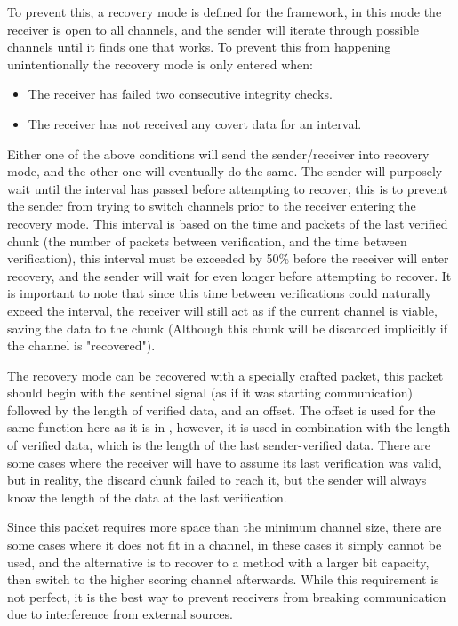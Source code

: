 To prevent this, a recovery mode is defined for the framework, in this mode the receiver is open to all channels, and the sender will iterate through possible channels until it finds one that works. To prevent this from happening unintentionally the recovery mode is only entered when:
\begin{itemize}
    \item The receiver has failed two consecutive integrity checks.
    \item The receiver has not received any covert data for an interval.
\end{itemize}

Either one of the above conditions will send the sender/receiver into recovery mode, and the other one will eventually do the same. The sender will purposely wait until the interval has passed before attempting to recover, this is to prevent the sender from trying to switch channels prior to the receiver entering the recovery mode. This interval is based on the time and packets of the last verified chunk (the number of packets between verification, and the time between verification), this interval must be exceeded by 50\% before the receiver will enter recovery, and the sender will wait for even longer before attempting to recover. It is important to note that since this time between verifications could naturally exceed the interval, the receiver will still act as if the current channel is viable, saving the data to the chunk (Although this chunk will be discarded implicitly if the channel is "recovered").

The recovery mode can be recovered with a specially crafted packet, this packet should begin with the sentinel signal (as if it was starting communication) followed by the length of verified data, and an offset. The offset is used for the same function here as it is in , however, it is used in combination with the length of verified data, which is the length of the last sender-verified data. There are some cases where the receiver will have to assume its last verification was valid, but in reality, the discard chunk failed to reach it, but the sender will always know the length of the data at the last verification.


Since this packet requires more space than the minimum channel size, there are some cases where it does not fit in a channel, in these cases it simply cannot be used, and the alternative is to recover to a method with a larger bit capacity, then switch to the higher scoring channel afterwards. While this requirement is not perfect, it is the best way to prevent receivers from breaking communication due to interference from external sources.

